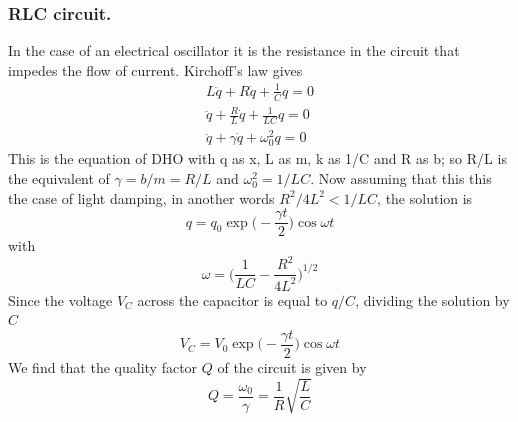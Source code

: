 \documentclass[../../main.tex]{subfiles}
\begin{document}
\subsubsection{RLC circuit.} In the case of an electrical oscillator it is the resistance in the circuit that impedes the flow of current. Kirchoff's law gives
\begin{align*}
    L\ddot{q}+R\dot{q}+\frac{1}{C}q=0\\
    \ddot{q}+\frac{R}{L}\dot{q}+\frac{1}{LC}q=0\\
    \ddot{q}+\gamma\dot{q}+\omega_0^2q=0
\end{align*}    
This is the equation of DHO with q as x, L as m, k as 1/C and R as b; so R/L is the equivalent of $\gamma=b/m=R/L$ and $\omega_0^2=1/LC$. Now assuming that this this the case of light damping, in another words $ R^2/4L^2<1/LC$, the solution is
\begin{equation*}
    q=q_0\exp\biggl(-\frac{\gamma t}{2}\biggr)\cos\omega t
\end{equation*} 
with\begin{equation*}
    \omega =\biggl(\frac{1}{LC}-\frac{R^2}{4L^2}\biggr)^{1/2}
\end{equation*}Since the voltage $V_C$ across the capacitor is equal to $q/C$, dividing the solution by $C$\begin{equation*}
    V_C=V_0\exp\biggl(-\frac{\gamma t}{2}\biggr)\cos\omega t
\end{equation*}
We find that the quality factor $Q$ of the circuit is given by
\begin{equation*}
    Q=\frac{\omega_0}{\gamma}=  \frac{1}{R}\sqrt{\frac{L}{C}}
\end{equation*}
\end{document}

